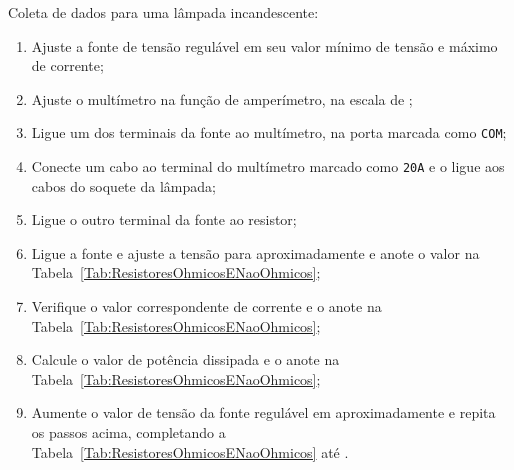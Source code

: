 Coleta de dados para uma lâmpada incandescente:
\begin{enumerate}
	\item Ajuste a fonte de tensão regulável em seu valor mínimo de tensão e máximo de corrente; 
	\item Ajuste o multímetro na função de amperímetro, na escala de ;
	\item Ligue um dos terminais da fonte ao multímetro, na porta marcada como \texttt{COM};
	\item Conecte um cabo ao terminal do multímetro marcado como \texttt{20A} e o ligue aos cabos do soquete da lâmpada;
	\item Ligue o outro terminal da fonte ao resistor;
	\item Ligue a fonte e ajuste a tensão para aproximadamente  e anote o valor na Tabela~\ref{Tab:ResistoresOhmicosENaoOhmicos};
	\item Verifique o valor correspondente de corrente e o anote na Tabela~\ref{Tab:ResistoresOhmicosENaoOhmicos};
	\item Calcule o valor de potência dissipada e o anote na Tabela~\ref{Tab:ResistoresOhmicosENaoOhmicos};
	\item Aumente o valor de tensão da fonte regulável em aproximadamente  e repita os passos acima, completando a Tabela~\ref{Tab:ResistoresOhmicosENaoOhmicos} até . 
\end{enumerate}


\cleardoublepage


\vspace{15mm}

